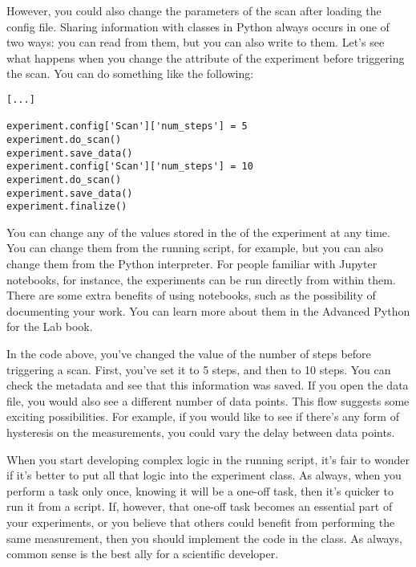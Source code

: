However, you could also change the parameters of the scan after loading the config file. Sharing information with classes in Python always occurs in one of two ways: you can read from them, but you can also write to them. Let's see what happens when you change the  attribute of the experiment before triggering the scan. You can do something like the following:

\begin{verbatim}
[...]

experiment.config['Scan']['num_steps'] = 5
experiment.do_scan()
experiment.save_data()
experiment.config['Scan']['num_steps'] = 10
experiment.do_scan()
experiment.save_data()
experiment.finalize()
\end{verbatim}

You can change any of the values stored in the  of the experiment at any time. You can change them from the running script, for example, but you can also change them from the Python interpreter. For people familiar with Jupyter notebooks, for instance, the experiments can be run directly from within them. There are some extra benefits of using notebooks, such as the possibility of documenting your work. You can learn more about them in the Advanced Python for the Lab book.


In the code above, you've changed the value of the number of steps before triggering a scan. First, you've set it to 5 steps, and then to 10 steps. You can check the metadata and see that this information was saved. If you open the data file, you would also see a different number of data points. This flow suggests some exciting possibilities. For example, if you would like to see if there's any form of hysteresis on the measurements, you could vary the delay between data points.


When you start developing complex logic in the running script, it's fair to wonder if it's better to put all that logic into the experiment class. As always, when you perform a task only once, knowing it will be a one-off task, then it's quicker to run it from a script. If, however, that one-off task becomes an essential part of your experiments, or you believe that others could benefit from performing the same measurement, then you should implement the code in the class. As always, common sense is the best ally for a scientific developer.


